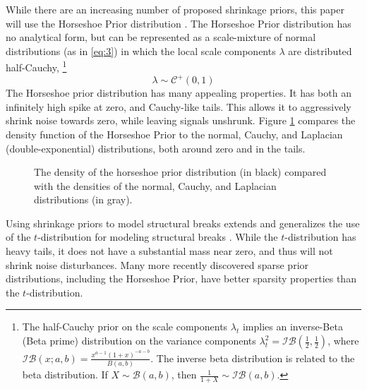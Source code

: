 \documentclass{article}
\newcommand{\dist}[1]{\mathcal{#1}}
\newcommand{\paren}[1]{\ensuremath{\left(#1\right)}}
\newcommand{\dhalfcauchy}[1]{\ensuremath{\dist{C}^{+}\paren{#1}}}
\newcommand{\dbeta}[1]{\ensuremath{\dist{B}\paren{#1}}}
\newcommand{\dinvbeta}[1]{\ensuremath{\dist{IB}\paren{#1}}}
\begin{document}
While there are an increasing number of proposed shrinkage priors, this paper will use the Horseshoe Prior distribution \parencites{CarvalhoPolsonScott2009}{CarvalhoPolsonScott2010}{PolsonScott2010}{PolsonScott2012}{DattaGhosh2012}.
The Horseshoe Prior distribution has no analytical form, but can be represented as a scale-mixture of normal distributions (as in \eqref{eq:3}) in which the local scale components $\lambda$ are distributed half-Cauchy,%
\footnote{
The half-Cauchy prior on the scale components $\lambda_{t}$ implies an inverse-Beta (Beta prime) distribution on the variance components $\lambda_{t}^{2} = \dinvbeta{\frac{1}{2}, \frac{1}{2}}$, where $\dinvbeta{x; a, b} = \frac{x^{a - 1} (1 + x)^{-a - b}}{B(a, b)}$.
The inverse beta distribution is related to the beta distribution.
If $X \sim \dbeta{a, b}$, then $\frac{1}{1 + X} \sim \dinvbeta{a, b}$.
}
\begin{equation}
  \label{eq:6}
  \lambda \sim \dhalfcauchy{0, 1}
\end{equation}
The Horseshoe prior distribution has many appealing properties.
It has both an infinitely high spike at zero, and Cauchy-like tails.
This allows it to aggressively shrink noise towards zero, while leaving signals unshrunk.
Figure \ref{fig:horseshoe} compares the density function of the Horseshoe Prior to the normal, Cauchy, and Laplacian (double-exponential) distributions, both around zero and in the tails.
\begin{figure}
  \centering
  \caption{The density of the horseshoe prior distribution (in black) compared with the densities of the normal, Cauchy, and Laplacian distributions (in gray).}
  \label{fig:horseshoe}
\end{figure}

Using shrinkage priors to model structural breaks extends and generalizes the use of the $t$-distribution for modeling structural breaks \textcites{HarveyKoopman2000}[184][]{DurbinKoopman2001}{PetrisPetroneEtAl2009}.
While the $t$-distribution has heavy tails, it does not have a substantial mass near zero, and thus will not shrink noise disturbances.
Many more recently discovered sparse prior distributions, including the Horseshoe Prior, have better sparsity properties than the $t$-distribution.
\end{document}
